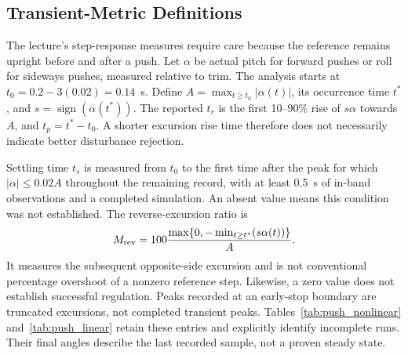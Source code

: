 \documentclass[conference,a4paper]{IEEEtran}
\begin{document}
\subsection{Transient-Metric Definitions}
The lecture's step-response measures require care because the reference remains upright before and after a push. Let $\alpha$ be actual pitch for forward pushes or roll for sideways pushes, measured relative to trim. The analysis starts at $t_0=0.2-3(0.02)=0.14$~s. Define $A=\max_{t\ge t_0}|\alpha(t)|$, its occurrence time $t^*$, and $s=\operatorname{sign}(\alpha(t^*))$. The reported $t_r$ is the first 10--90\% rise of $s\alpha$ towards $A$, and $t_p=t^*-t_0$. A shorter excursion rise time therefore does not necessarily indicate better disturbance rejection.

Settling time $t_s$ is measured from $t_0$ to the first time after the peak for which $|\alpha|\le0.02A$ throughout the remaining record, with at least 0.5~s of in-band observations and a completed simulation. An absent value means this condition was not established. The reverse-excursion ratio is
\[
M_{\rm rev}=100\frac{\max\{0,-\min_{t\ge t^*}(s\alpha(t))\}}{A}.
\]
It measures the subsequent opposite-side excursion and is not conventional percentage overshoot of a nonzero reference step. Likewise, a zero value does not establish successful regulation. Peaks recorded at an early-stop boundary are truncated excursions, not completed transient peaks. Tables~\ref{tab:push_nonlinear} and~\ref{tab:push_linear} retain these entries and explicitly identify incomplete runs. Their final angles describe the last recorded sample, not a proven steady state.
\end{document}

